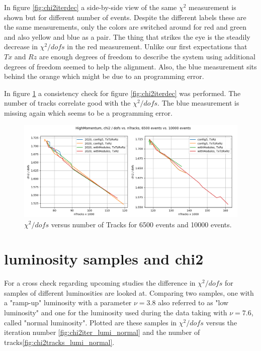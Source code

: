 In figure \ref{fig:chi2iterdec} a side-by-side view of the same $\chi^2$ measurement
is shown but for different number of events. Despite the different labels these are the same measurements, only the colors are switched around for red and green and also yellow and blue as a pair. The thing that strikes the eye is the steadily decrease in $\chi^2 / dofs$ in the red measurement. Unlike our first expectations that $Tx$ and $Rz$ are enough degrees of freedom to describe the system using additional degrees of freedom seemed to help the alignment.
Also, the blue measurement sits behind the orange which might be due to an
programming error.

In figure \ref{fig:chi2tracksdec} a consistency check for figure
\ref{fig:chi2iterdec} was performed. The number of tracks correlate good with
the $\chi^2 / dofs$. The blue measurement is missing again which seems to be a
programming error.

\begin{figure}
  \centering
  \includegraphics[width=\textwidth]{plots/LHCB_week_dec/chi2_vs_tracks_normal.png}
  \caption{$\chi^2 / dofs$ versus number of Tracks for 6500 events and 10000 events.}
  \label{fig:chi2tracksdec}
\end{figure}


\section{luminosity samples and chi2}
For a cross check regarding upcoming studies the difference in $\chi^2 / dofs$ for samples of different luminosities are looked at.
Comparing two samples, one with a "ramp-up" luminosity with a parameter $\nu = 3.8$ also referred to as "low luminosity" and one for the luminosity used during the data taking
with $\nu = 7.6$, called "normal luminosity".
Plotted are these samples in $\chi^2 / dofs$ versus the iteration number \ref{fig:chi2iter_lumi_normal} and the number of tracks\ref{fig:chi2tracks_lumi_normal}.

